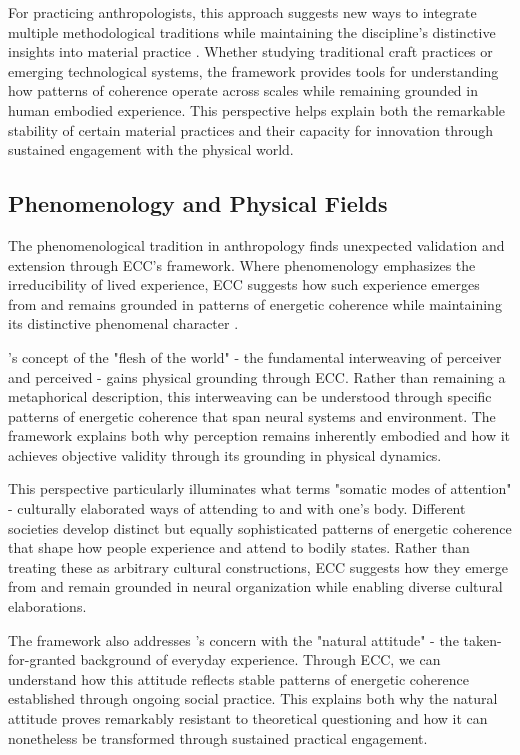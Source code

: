 \begin{refsection}
For practicing anthropologists, this approach suggests new ways to integrate multiple methodological traditions while maintaining the discipline's distinctive insights into material practice \cite{warnier2001praxeological}. Whether studying traditional craft practices or emerging technological systems, the framework provides tools for understanding how patterns of coherence operate across scales while remaining grounded in human embodied experience. This perspective helps explain both the remarkable stability of certain material practices and their capacity for innovation through sustained engagement with the physical world.

\subsection{Phenomenology and Physical Fields}

The phenomenological tradition in anthropology finds unexpected validation and extension through ECC's framework. Where phenomenology emphasizes the irreducibility of lived experience, ECC suggests how such experience emerges from and remains grounded in patterns of energetic coherence while maintaining its distinctive phenomenal character \cite{merleau1968visible}.

\cite{merleau1968visible}'s concept of the "flesh of the world" - the fundamental interweaving of perceiver and perceived - gains physical grounding through ECC. Rather than remaining a metaphorical description, this interweaving can be understood through specific patterns of energetic coherence that span neural systems and environment. The framework explains both why perception remains inherently embodied and how it achieves objective validity through its grounding in physical dynamics.

This perspective particularly illuminates what \cite{csordas1993somatic} terms "somatic modes of attention" - culturally elaborated ways of attending to and with one's body. Different societies develop distinct but equally sophisticated patterns of energetic coherence that shape how people experience and attend to bodily states. Rather than treating these as arbitrary cultural constructions, ECC suggests how they emerge from and remain grounded in neural organization while enabling diverse cultural elaborations.

The framework also addresses \cite{schutz1945multiple}'s concern with the "natural attitude" - the taken-for-granted background of everyday experience. Through ECC, we can understand how this attitude reflects stable patterns of energetic coherence established through ongoing social practice. This explains both why the natural attitude proves remarkably resistant to theoretical questioning and how it can nonetheless be transformed through sustained practical engagement.


\end{refsection}
